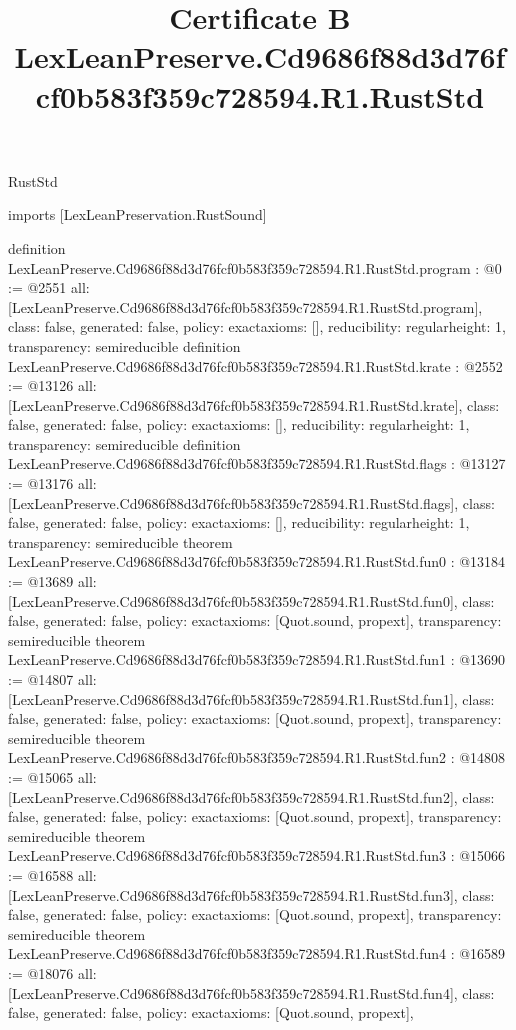 \begin{lexlean}{RustStd}
\title{Certificate B LexLeanPreserve.Cd9686f88d3d76fcf0b583f359c728594.R1.RustStd}
\begin{coremodule}
imports [LexLeanPreservation.RustSound]

definition LexLeanPreserve.Cd9686f88d3d76fcf0b583f359c728594.R1.RustStd.program : @0 := @2551 {
  all: [LexLeanPreserve.Cd9686f88d3d76fcf0b583f359c728594.R1.RustStd.program],
  class: false,
  generated: false,
  policy: exact{axioms: []},
  reducibility: regular{height: 1},
  transparency: semireducible
}
definition LexLeanPreserve.Cd9686f88d3d76fcf0b583f359c728594.R1.RustStd.krate : @2552 := @13126 {
  all: [LexLeanPreserve.Cd9686f88d3d76fcf0b583f359c728594.R1.RustStd.krate],
  class: false,
  generated: false,
  policy: exact{axioms: []},
  reducibility: regular{height: 1},
  transparency: semireducible
}
definition LexLeanPreserve.Cd9686f88d3d76fcf0b583f359c728594.R1.RustStd.flags : @13127 := @13176 {
  all: [LexLeanPreserve.Cd9686f88d3d76fcf0b583f359c728594.R1.RustStd.flags],
  class: false,
  generated: false,
  policy: exact{axioms: []},
  reducibility: regular{height: 1},
  transparency: semireducible
}
theorem LexLeanPreserve.Cd9686f88d3d76fcf0b583f359c728594.R1.RustStd.fun0 : @13184 := @13689 {
  all: [LexLeanPreserve.Cd9686f88d3d76fcf0b583f359c728594.R1.RustStd.fun0],
  class: false,
  generated: false,
  policy: exact{axioms: [Quot.sound, propext]},
  transparency: semireducible
}
theorem LexLeanPreserve.Cd9686f88d3d76fcf0b583f359c728594.R1.RustStd.fun1 : @13690 := @14807 {
  all: [LexLeanPreserve.Cd9686f88d3d76fcf0b583f359c728594.R1.RustStd.fun1],
  class: false,
  generated: false,
  policy: exact{axioms: [Quot.sound, propext]},
  transparency: semireducible
}
theorem LexLeanPreserve.Cd9686f88d3d76fcf0b583f359c728594.R1.RustStd.fun2 : @14808 := @15065 {
  all: [LexLeanPreserve.Cd9686f88d3d76fcf0b583f359c728594.R1.RustStd.fun2],
  class: false,
  generated: false,
  policy: exact{axioms: [Quot.sound, propext]},
  transparency: semireducible
}
theorem LexLeanPreserve.Cd9686f88d3d76fcf0b583f359c728594.R1.RustStd.fun3 : @15066 := @16588 {
  all: [LexLeanPreserve.Cd9686f88d3d76fcf0b583f359c728594.R1.RustStd.fun3],
  class: false,
  generated: false,
  policy: exact{axioms: [Quot.sound, propext]},
  transparency: semireducible
}
theorem LexLeanPreserve.Cd9686f88d3d76fcf0b583f359c728594.R1.RustStd.fun4 : @16589 := @18076 {
  all: [LexLeanPreserve.Cd9686f88d3d76fcf0b583f359c728594.R1.RustStd.fun4],
  class: false,
  generated: false,
  policy: exact{axioms: [Quot.sound, propext]},
}
\end{coremodule}
\end{lexlean}
